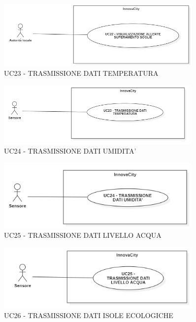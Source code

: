 \begin{figure}[H]
    \centering
    \includegraphics[width=0.9\textwidth]{../Images/uc22.PNG}
    \caption{UC23 - TRASMISSIONE DATI TEMPERATURA}
    \label{fig:UC7}
\end{figure}

\begin{figure}[H]
    \centering
    \includegraphics[width=0.9\textwidth]{../Images/uc23.PNG}
    \caption{UC24 - TRASMISSIONE DATI UMIDITA'}
    \label{fig:UC7}
\end{figure}

\begin{figure}[H]
    \centering
    \includegraphics[width=0.9\textwidth]{../Images/uc24.PNG}
    \caption{UC25 - TRASMISSIONE DATI LIVELLO ACQUA}
    \label{fig:UC7}
\end{figure}

\begin{figure}[H]
    \centering
    \includegraphics[width=0.9\textwidth]{../Images/uc25.PNG}
    \caption{UC26 - TRASMISSIONE DATI ISOLE ECOLOGICHE}
    \label{fig:UC7}
\end{figure}
